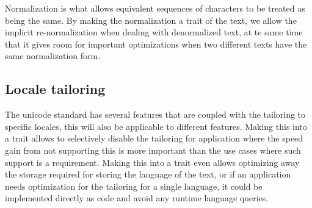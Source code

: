 Normalization is what allows equivalent sequences of characters to be treated as being the same. By making the normalization a trait of the text, we allow the implicit re-\/normalization when dealing with denormalized text, at te same time that it gives room for important optimizations when two different texts have the same normalization form.

\subsection*{Locale tailoring}

The unicode standard has several features that are coupled with the tailoring to specific locales, this will also be applicable to different features. Making this into a trait allows to selectively disable the tailoring for application where the speed gain from not supporting this is more important than the use cases where such support is a requirement. Making this into a trait even allows optimizing away the storage required for storing the language of the text, or if an application needs optimization for the tailoring for a single language, it could be implemented directly as code and avoid any runtime language queries. 